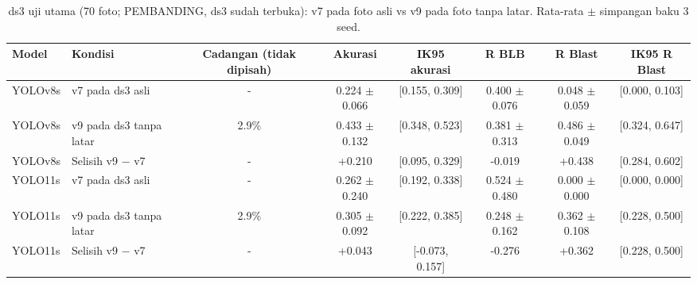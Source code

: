 \begin{table}[!t]
\centering
\caption{ds3 uji utama (70 foto; PEMBANDING, ds3 sudah terbuka): v7 pada foto asli vs v9 pada foto tanpa latar. Rata-rata $\pm$ simpangan baku 3 seed.}
\label{tab:v9_ds3}
\footnotesize
\setlength{\tabcolsep}{3pt}
\begin{tabular}{llcccccc}
\hline
\textbf{Model} & \textbf{Kondisi} & \textbf{Cadangan (tidak dipisah)} & \textbf{Akurasi} & \textbf{IK95 akurasi} & \textbf{R BLB} & \textbf{R Blast} & \textbf{IK95 R Blast} \\
\hline
YOLOv8s & v7 pada ds3 asli & - & 0.224 $\pm$ 0.066 & [0.155, 0.309] & 0.400 $\pm$ 0.076 & 0.048 $\pm$ 0.059 & [0.000, 0.103] \\
YOLOv8s & v9 pada ds3 tanpa latar & 2.9\% & 0.433 $\pm$ 0.132 & [0.348, 0.523] & 0.381 $\pm$ 0.313 & 0.486 $\pm$ 0.049 & [0.324, 0.647] \\
YOLOv8s & Selisih v9 $-$ v7 & - & +0.210 & [0.095, 0.329] & -0.019 & +0.438 & [0.284, 0.602] \\
YOLO11s & v7 pada ds3 asli & - & 0.262 $\pm$ 0.240 & [0.192, 0.338] & 0.524 $\pm$ 0.480 & 0.000 $\pm$ 0.000 & [0.000, 0.000] \\
YOLO11s & v9 pada ds3 tanpa latar & 2.9\% & 0.305 $\pm$ 0.092 & [0.222, 0.385] & 0.248 $\pm$ 0.162 & 0.362 $\pm$ 0.108 & [0.228, 0.500] \\
YOLO11s & Selisih v9 $-$ v7 & - & +0.043 & [-0.073, 0.157] & -0.276 & +0.362 & [0.228, 0.500] \\
\hline
\end{tabular}
\end{table}
